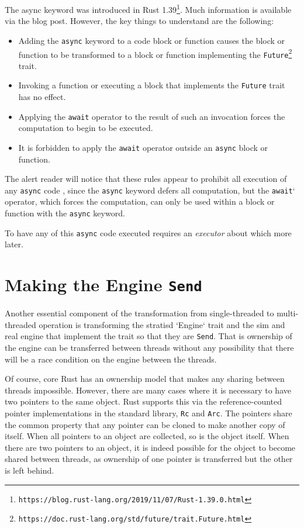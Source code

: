 \documentclass[]{article}
\begin{document}
The async keyword was introduced in Rust 1.39\footnote{\texttt{https://blog.rust-lang.org/2019/11/07/Rust-1.39.0.html}}. Much information is available via the blog post. However, the key things to understand are the following:

\begin{itemize}
\item Adding the \texttt{async} keyword to a code block or function causes the block or function to be transformed to a block or function implementing the \texttt{Future}\footnote{\texttt{https://doc.rust-lang.org/std/future/trait.Future.html}} trait.

\item Invoking a function or executing a block that implements the \texttt{Future} trait has no effect.

\item Applying the \texttt{await} operator to the result of such an invocation forces the computation to begin to be executed.

\item It is forbidden to apply the \texttt{await} operator outside an \texttt{async} block or function.
\end{itemize}

The alert reader will notice that these rules appear to prohibit all execution of any \texttt{async} code , since the \texttt{async} keyword defers all computation, but the \texttt{await}` operator, which forces the computation, can only be used within a block or function with the \texttt{async} keyword.

To have any of this \texttt{async} code executed requires an \emph{executor} about which more later.

\section{Making the Engine \texttt{Send}}
Another essential component of the transformation from single-threaded to multi-threaded operation is transforming the stratisd `Engine` trait and the sim and real engine that implement the trait so that they are \texttt{Send}. That is
ownership of the engine can be transferred between threads without any possibility that there will be a race condition on the engine between the threads.

Of course, core Rust has an ownership model that makes any sharing between threads impossible. However, there are many cases where it is necessary to have two pointers to the same object. Rust supports this via the reference-counted pointer implementations in the standard library, \texttt{Rc} and \texttt{Arc}. The pointers share the common property that any pointer can be cloned to make another copy of itself. When all pointers to an object are collected, so is the object itself. When there are two pointers to an object, it is indeed possible for the object to become shared between threads, as ownership of one pointer is transferred but the other is left behind.
\end{document}
